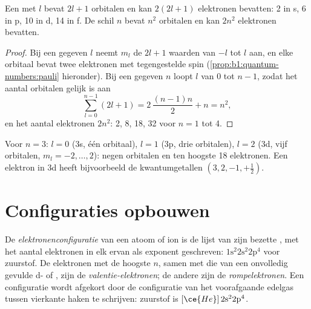 \begin{proposition}\label{prop:b1:quantum-numbers:capacity}
Een  met  $l$ bevat $2l + 1$ orbitalen en kan
$2(2l + 1)$ elektronen bevatten: 2 in s, 6 in p, 10 in d, 14 in f. De
schil $n$ bevat $n^2$ orbitalen en kan $2n^2$ elektronen bevatten.
\end{proposition}

\begin{proof}
Bij een gegeven $l$ neemt $m_l$ de $2l + 1$ waarden van $-l$ tot $l$
aan, en elke orbitaal bevat twee elektronen met tegengestelde spin
(\cref{prop:b1:quantum-numbers:pauli} hieronder). Bij een gegeven $n$
loopt $l$ van $0$ tot $n - 1$, zodat het aantal orbitalen gelijk is aan
\[
  \sum_{l=0}^{n-1} (2l+1) = 2\,\frac{(n-1)n}{2} + n = n^2 ,
\]
en het aantal elektronen $2n^2$: 2, 8, 18, 32 voor $n = 1$ tot 4.
\end{proof}

\begin{example}\label{ex:b1:quantum-numbers:third}
Voor $n = 3$: $l = 0$ (3s, één orbitaal), $l = 1$ (3p, drie orbitalen),
$l = 2$ (3d, vijf orbitalen, $m_l = -2, \dots, 2$): negen orbitalen en
ten hoogste 18 elektronen. Een elektron in 3d heeft bijvoorbeeld de
kwantumgetallen $(3, 2, -1, +\tfrac12)$.
\end{example}

\section{Configuraties opbouwen}

\begin{definition}[Elektronenconfiguratie]\label{def:b1:quantum-numbers:configuration}
De \emph{elektronenconfiguratie} van een
atoom of ion is de lijst van zijn bezette , met het aantal
elektronen in elk ervan als exponent geschreven: $1\text{s}^2 2\text{s}^2
2\text{p}^4$ voor zuurstof. De elektronen met de hoogste $n$, samen met
die van een onvolledig gevulde d- of , zijn de
\emph{valentie-elektronen}; de andere zijn de
\emph{rompelektronen}. Een configuratie wordt
afgekort door de configuratie van het voorafgaande edelgas tussen
vierkante haken te schrijven: zuurstof is $[\ce{He}]\,2\text{s}^2 2\text{p}^4$.
\end{definition}

